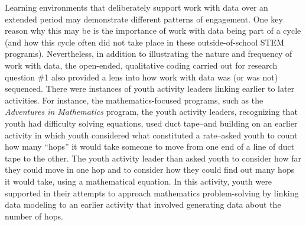 \documentclass[]{msu-thesis}
\theoremstyle{definition}
\theoremstyle{definition}
\theoremstyle{definition}
\theoremstyle{remark}
\begin{document}
Learning environments that deliberately support work with data over an
extended period may demonstrate different patterns of engagement. One
key reason why this may be is the importance of work with data being
part of a cycle (and how this cycle often did not take place in these
outside-of-school STEM programs). Nevertheless, in addition to
illustrating the nature and frequency of work with data, the open-ended,
qualitative coding carried out for research question \#1 also provided a
lens into how work with data was (or was not) sequenced. There were
instances of youth activity leaders linking earlier to later activities.
For instance, the mathematics-focused programs, such as the
\emph{Adventures in Mathematics} program, the youth activity leaders,
recognizing that youth had difficulty solving equations, used duct
tape--and building on an earlier activity in which youth considered what
constituted a rate--asked youth to count how many ``hops'' it would take
someone to move from one end of a line of duct tape to the other. The
youth activity leader than asked youth to consider how far they could
move in one hop and to consider how they could find out many hops it
would take, using a mathematical equation. In this activity, youth were
supported in their attempts to approach mathematics problem-solving by
linking data modeling to an earlier activity that involved generating
data about the number of hops.
\end{document}
